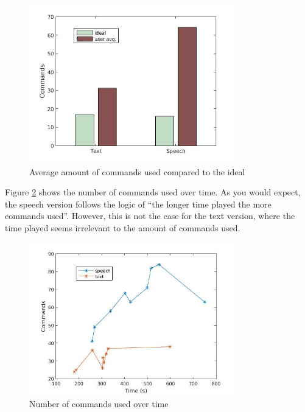 \begin{figure}[ht]
  \centering
  \includegraphics[width=0.8\textwidth]{images/ideal_cmd.jpg}
  \caption{Average amount of commands used compared to the ideal}\label{ideal_cmd}
\end{figure}

Figure \ref{time_cmd} shows the number of commands used over time. As you would expect, the speech version follows the logic of ``the longer time played the more commands used''. However, this is not the case for the text version, where the time played seems irrelevant to the amount of commands used.

\begin{figure}[ht]
  \centering
  \includegraphics[width=0.8\textwidth]{images/time_cmd.jpg} %
  \caption{Number of commands used over time}\label{time_cmd}
\end{figure}

